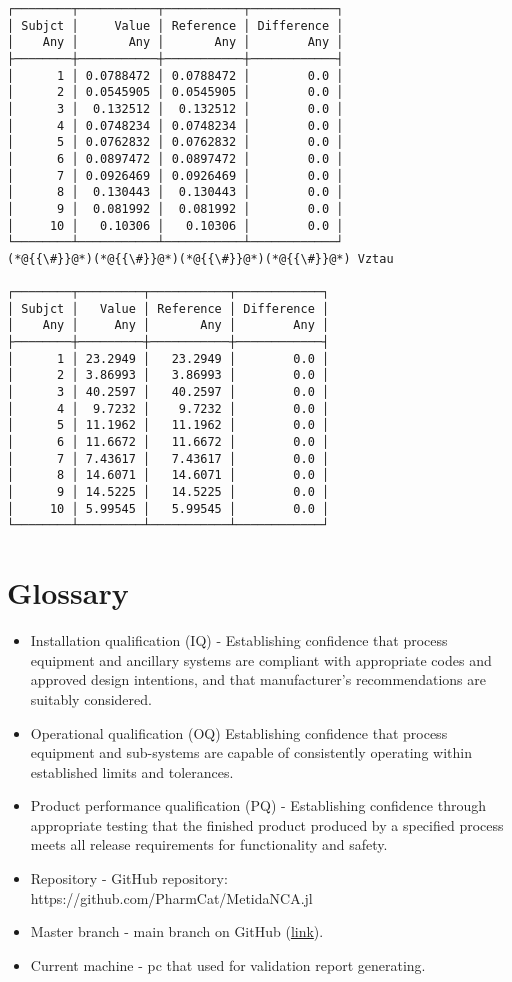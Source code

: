 \documentclass[12pt,a4paper]{article}
\begin{document}
\begin{lstlisting}
┌────────┬───────────┬───────────┬────────────┐
│ Subjct │     Value │ Reference │ Difference │
│    Any │       Any │       Any │        Any │
├────────┼───────────┼───────────┼────────────┤
│      1 │ 0.0788472 │ 0.0788472 │        0.0 │
│      2 │ 0.0545905 │ 0.0545905 │        0.0 │
│      3 │  0.132512 │  0.132512 │        0.0 │
│      4 │ 0.0748234 │ 0.0748234 │        0.0 │
│      5 │ 0.0762832 │ 0.0762832 │        0.0 │
│      6 │ 0.0897472 │ 0.0897472 │        0.0 │
│      7 │ 0.0926469 │ 0.0926469 │        0.0 │
│      8 │  0.130443 │  0.130443 │        0.0 │
│      9 │  0.081992 │  0.081992 │        0.0 │
│     10 │   0.10306 │   0.10306 │        0.0 │
└────────┴───────────┴───────────┴────────────┘
(*@{{\#}}@*)(*@{{\#}}@*)(*@{{\#}}@*)(*@{{\#}}@*) Vztau

┌────────┬─────────┬───────────┬────────────┐
│ Subjct │   Value │ Reference │ Difference │
│    Any │     Any │       Any │        Any │
├────────┼─────────┼───────────┼────────────┤
│      1 │ 23.2949 │   23.2949 │        0.0 │
│      2 │ 3.86993 │   3.86993 │        0.0 │
│      3 │ 40.2597 │   40.2597 │        0.0 │
│      4 │  9.7232 │    9.7232 │        0.0 │
│      5 │ 11.1962 │   11.1962 │        0.0 │
│      6 │ 11.6672 │   11.6672 │        0.0 │
│      7 │ 7.43617 │   7.43617 │        0.0 │
│      8 │ 14.6071 │   14.6071 │        0.0 │
│      9 │ 14.5225 │   14.5225 │        0.0 │
│     10 │ 5.99545 │   5.99545 │        0.0 │
└────────┴─────────┴───────────┴────────────┘
\end{lstlisting}


\section{Glossary}
\begin{itemize}
\item Installation qualification (IQ) - Establishing confidence that process equipment and ancillary systems are compliant with appropriate codes and approved design intentions, and that manufacturer's recommendations are suitably considered.


\item Operational qualification (OQ) Establishing confidence that process equipment and sub-systems are capable of consistently operating within established limits and tolerances.


\item Product performance qualification (PQ) - Establishing confidence through appropriate testing that the finished product produced by a specified process meets all release requirements for functionality and safety.


\item Repository - GitHub repository: https://github.com/PharmCat/MetidaNCA.jl


\item Master branch - main branch on GitHub (\href{https://github.com/PharmCat/MetidaNCA.jl/tree/main}{link}).


\item Current machine - pc that used for validation report generating.

\end{itemize}
\end{document}
